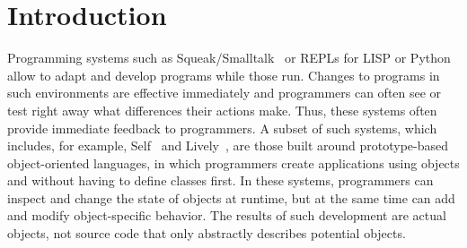 
\chapter{Introduction} \label{chapter:INTRODUCTION}

Programming systems such as Squeak/Smalltalk~\cite{GoldbergRobson83} or REPLs for LISP or Python allow to adapt and develop programs while those run.
Changes to programs in such environments are effective immediately and programmers can often see or test right away what differences their actions make.
Thus, these systems often provide immediate feedback to programmers.
A subset of such systems, which includes, for example, Self~\cite{Ungar1987SPS,Ungar2007SEL} and Lively~\cite{Ingalls2008LKS,Krahn2009LWD}, are those built around prototype-based object-oriented languages, in which programmers create applications using objects and without having to define classes first.
In these systems, programmers can inspect and change the state of objects at runtime, but at the same time can add and modify object-specific behavior.
The results of such development are actual objects, not source code that only abstractly describes potential objects.

